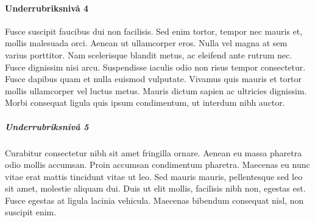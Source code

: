 \documentclass[paper=a4, fontsize=11pt]{article} %
\begin{document}
\paragraph{Underrubriksnivå 4}
Fusce suscipit faucibus dui non facilisis. Sed enim tortor, tempor nec mauris et, mollis malesuada orci. Aenean ut ullamcorper eros. Nulla vel magna at sem varius porttitor. Nam scelerisque blandit metus, ac eleifend ante rutrum nec. Fusce dignissim nisi arcu. Suspendisse iaculis odio non risus tempor consectetur. Fusce dapibus quam et nulla euismod vulputate. Vivamus quis mauris et tortor mollis ullamcorper vel luctus metus. Mauris dictum sapien ac ultricies dignissim. Morbi consequat ligula quis ipsum condimentum, ut interdum nibh auctor.
\subparagraph{Underrubriksnivå 5}
Curabitur consectetur nibh sit amet fringilla ornare. Aenean eu massa pharetra odio mollis accumsan. Proin accumsan condimentum pharetra. Maecenas eu nunc vitae erat mattis tincidunt vitae ut leo. Sed mauris mauris, pellentesque sed leo sit amet, molestie aliquam dui. Duis ut elit mollis, facilisis nibh non, egestas est. Fusce egestas at ligula lacinia vehicula. Maecenas bibendum consequat nisl, non suscipit enim.
%
\newpage


\newpage
\appendix

\end{document}
